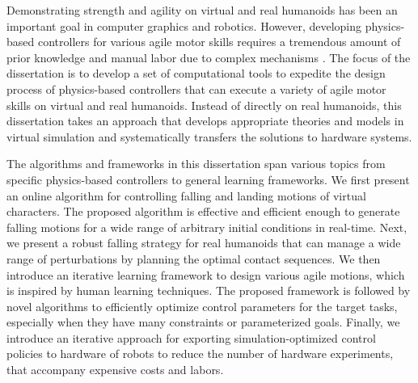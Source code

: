 
Demonstrating strength and agility on virtual and real humanoids has
been an important goal in computer graphics and robotics.
However, developing physics-based controllers for various agile motor skills
requires a tremendous amount of prior knowledge and manual labor due to
complex mechanisms .
The focus of the dissertation is to develop a set of computational tools to
expedite the design process of physics-based controllers that can execute a
variety of agile motor skills on virtual and real humanoids.
Instead of directly  on real humanoids, this
dissertation takes an approach that develops appropriate theories and models in
virtual simulation and systematically transfers the solutions to hardware systems.

The algorithms and frameworks in this dissertation span various topics from
specific physics-based controllers to general learning frameworks.
We first present an online algorithm for controlling falling and landing
motions of virtual characters.
The proposed algorithm is effective and efficient enough to generate falling
motions for a wide range of arbitrary initial conditions in real-time.
Next, we present a robust falling strategy for real humanoids that can manage
a wide range of perturbations by planning the optimal contact sequences.
We then introduce an iterative learning framework to  design
various agile motions, which is inspired by human learning techniques.
The proposed framework is followed by novel algorithms to
efficiently optimize control parameters for the target tasks, especially when
they have many constraints or parameterized goals.
Finally, we introduce an iterative approach for exporting simulation-optimized
control policies to hardware of robots to reduce the number of hardware
experiments, that accompany expensive costs and labors.





